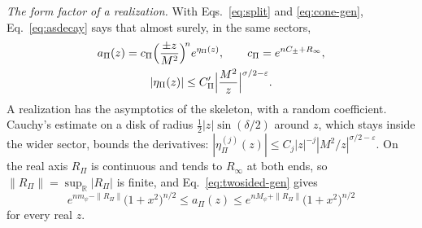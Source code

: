\documentclass[aps,prd,10pt,twocolumn,superscriptaddress,nofootinbib,floatfix,longbibliography]{revtex4-2}
\newcommand{\bR}{\mathbb{R}}
\begin{document}
\textit{The form factor of a realization.} With Eqs.~\eqref{eq:split} and \eqref{eq:cone-gen}, Eq.~\eqref{eq:asdecay} says that almost surely, in the same sectors,
\begin{equation}
\label{eq:cone-real}
\begin{gathered}
a_\Pi(z)=c_\Pi\Bigl(\frac{\pm z}{M^2}\Bigr)^{\!n}e^{\eta_\Pi(z)},\qquad c_\Pi=e^{nC_\pm+R_\infty},\\
|\eta_\Pi(z)|\le C'_\Pi\Bigl|\frac{M^2}z\Bigr|^{\sigma/2-\varepsilon}.
\end{gathered}
\end{equation}
A realization has the asymptotics of the skeleton, with a random coefficient. Cauchy's estimate on a disk of radius $\frac12|z|\sin(\delta/2)$ around $z$, which stays inside the wider sector, bounds the derivatives: $|\eta_\Pi^{(j)}(z)|\le C_j|z|^{-j}|M^2/z|^{\sigma/2-\varepsilon}$. On the real axis $R_\Pi$ is continuous and tends to $R_\infty$ at both ends, so $\|R_\Pi\|=\sup_{\bR}|R_\Pi|$ is finite, and Eq.~\eqref{eq:twosided-gen} gives
\begin{equation}
\label{eq:twosided-real}
e^{nm_\psi-\|R_\Pi\|}\bigl(1+x^2\bigr)^{n/2}\le a_\Pi(z)\le e^{nM_\psi+\|R_\Pi\|}\bigl(1+x^2\bigr)^{n/2}
\end{equation}
for every real $z$.
\end{document}
